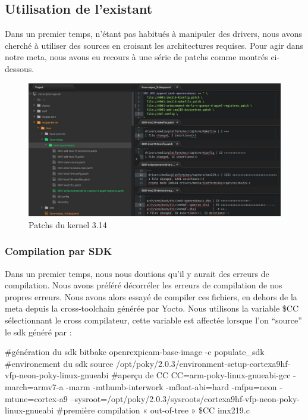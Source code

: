 {\subsection{Utilisation de l'existant}

Dans un premier temps, n’étant pas habitués à manipuler des drivers, nous avons
cherché à utiliser des sources en croisant les architectures requises. Pour agir dans notre meta,
nous avons eu recours à une série de patchs comme montrés ci-dessous.

\begin{figure}[!htb]
    \centering
    \includegraphics[trim={0cm 0cm 0cm 0cm},clip,scale=0.35]{Figures/patchs.png}
    \decoRule
    \caption{Patchs du kernel 3.14} \label{fig:patchs}
\end{figure} 

\subsubsection{Compilation par SDK}

Dans un premier temps, nous nous doutions qu’il y aurait des erreurs de compilation.
Nous avons préféré décorréler les erreurs de compilation de nos propres erreurs. Nous
avons alors essayé de compiler ces fichiers, en dehors de la meta depuis la
cross-toolchain générée par Yocto. Nous utilisons la variable \$CC sélectionnant le cross
compilateur, cette variable est affectée lorsque l’on “source” le sdk généré par :

\begin{tcolorbox}
    \#génération du sdk
    bitbake openrexpicam-base-image -c populate\_sdk
    \#environement du sdk
    source /opt/poky/2.0.3/environment-setup-cortexa9hf-vfp-neon-poky-linux-gnueabi
    \#aperçu de CC
    CC=arm-poky-linux-gnueabi-gcc -march=armv7-a -marm -mthumb-interwork -mfloat-abi=hard -mfpu=neon
    -mtune=cortex-a9 –sysroot=/opt/poky/2.0.3/sysroots/cortexa9hf-vfp-neon-poky-linux-gnueabi
    \#première compilation « out-of-tree »
    \$CC imx219.c
\end{tcolorbox}

}
